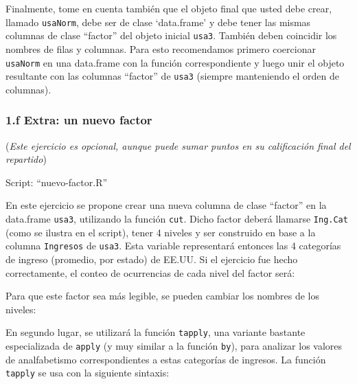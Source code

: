 \documentclass[]{article}
\newenvironment{Shaded}{}{}
\newcommand{\KeywordTok}[1]{\textcolor[rgb]{0.00,0.44,0.13}{\textbf{{#1}}}}
\newcommand{\DecValTok}[1]{\textcolor[rgb]{0.25,0.63,0.44}{{#1}}}
\newcommand{\StringTok}[1]{\textcolor[rgb]{0.25,0.44,0.63}{{#1}}}
\newcommand{\NormalTok}[1]{{#1}}
\begin{document}
Finalmente, tome en cuenta también que el objeto final que usted debe
crear, llamado \texttt{usaNorm}, debe ser de clase `data.frame' y debe
tener las mismas columnas de clase ``factor'' del objeto inicial
\texttt{usa3}. También deben coincidir los nombres de filas y columnas.
Para esto recomendamos primero coercionar \texttt{usaNorm} en una
data.frame con la función correspondiente y luego unir el objeto
resultante con las columnas ``factor'' de \texttt{usa3} (siempre
manteniendo el orden de columnas).

\subsubsection{1.f Extra: un nuevo factor}

(\emph{Este ejercicio es opcional, aunque puede sumar puntos en su
calificación final del repartido})

Script: ``nuevo-factor.R''

En este ejercicio se propone crear una nueva columna de clase ``factor''
en la data.frame \texttt{usa3}, utilizando la función \texttt{cut}.
Dicho factor deberá llamarse \texttt{Ing.Cat} (como se ilustra en el
script), tener 4 niveles y ser construido en base a la columna
\texttt{Ingresos} de \texttt{usa3}. Esta variable representará entonces
las 4 categorías de ingreso (promedio, por estado) de EE.UU. Si el
ejercicio fue hecho correctamente, el conteo de ocurrencias de cada
nivel del factor será:

\begin{Shaded}
\end{Shaded}

Para que este factor sea más legible, se pueden cambiar los nombres de
los niveles:

\begin{Shaded}
\end{Shaded}

En segundo lugar, se utilizará la función \texttt{tapply}, una variante
bastante especializada de \texttt{apply} (y muy similar a la función
\texttt{by}), para analizar los valores de analfabetismo
correspondientes a estas categorías de ingresos. La función
\texttt{tapply} se usa con la siguiente sintaxis:
\end{document}
